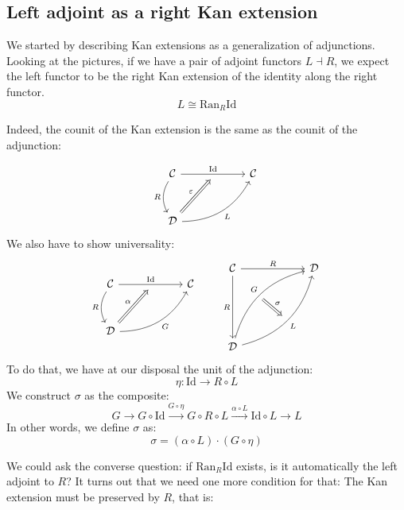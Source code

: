 \documentclass[DaoFP]{subfiles}
\begin{document}
 \subsection{Left adjoint as a right Kan extension}
 
 We started by describing Kan extensions as a generalization of adjunctions. Looking at the pictures, if we have a pair of adjoint functors $L \dashv R$, we expect the left functor to be the right Kan extension of the identity along the right functor.
 \[ L \cong \text{Ran}_R \text{Id} \]
 
 Indeed, the counit of the Kan extension is the same as the counit of the adjunction:

 \[
 \begin{tikzcd} [row sep=1cm, column sep=1cm]
 \cat C
 \arrow[rr, "\text{Id}", "" {name=ID, below} ]
 \arrow[d, bend right, "R"']
 && \cat C
 \\
 \cat D
  \arrow[urr, bend right, "L"']
 \arrow[Rightarrow, "\varepsilon",  to=ID]
 \end{tikzcd}
\]
We also have to show universality:
\[
 \begin{tikzcd} [row sep=1cm, column sep=1cm]
 \cat C
 \arrow[rr, "\text{\text{Id}}", "" {name=ID, below} ]
 \arrow[d, bend right, "R"']
 && \cat C
 \\
 \cat D
  \arrow[urr, bend right, "G"']
 \arrow[Rightarrow, "\alpha",  to=ID]
 \end{tikzcd}
 \qquad %
\begin{tikzcd}[row sep=2cm, column sep=2cm]
\cat C  \ar[d, "R"', "" {name=P}]
            \ar[r, "R", ""  {name=F, below, near start, bend right}]
&
\cat D
\\
\cat D
    \ar[ur, bend left, "G", "" {name=G, below}]
    \ar[ur, bend right, "L"', "" {name=Ran}]
\arrow[Rightarrow, "\sigma", from=G, to=Ran]
\end{tikzcd}
\]
To do that, we have at our disposal the unit of the adjunction:
\[ \eta \colon \text{Id} \to R \circ L \]
We construct $\sigma$ as the composite:
\[ G \rightarrow G \circ \text{Id} \xrightarrow{G \circ \eta} G \circ R \circ L \xrightarrow{\alpha \circ L} \text{Id} \circ L \rightarrow L\]
In other words, we define $\sigma$ as:
\[ \sigma = (\alpha \circ L) \cdot (G \circ \eta) \]

We could ask the converse question: if $\text{Ran}_R \text{Id}$ exists, is it automatically the left adjoint to $R$? It turns out that we need one more condition for that: The Kan extension must be preserved by $R$, that is:
\end{document}
